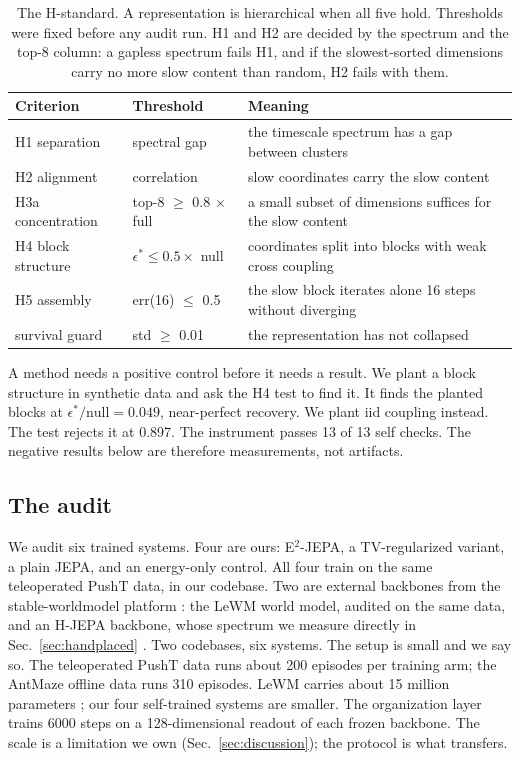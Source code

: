\documentclass[11pt]{article}
\begin{document}
\begin{table}[t]
\centering
\caption{The H-standard. A representation is hierarchical when all five hold. Thresholds were fixed before any audit run. H1 and H2 are decided by the spectrum and the top-8 column: a gapless spectrum fails H1, and if the slowest-sorted dimensions carry no more slow content than random, H2 fails with them.}
\label{tab:hstandard}
\begin{tabular}{llp{7.2cm}}
\toprule
Criterion & Threshold & Meaning \\
\midrule
H1 separation & spectral gap & the timescale spectrum has a gap between clusters \\
H2 alignment & correlation & slow coordinates carry the slow content \\
H3a concentration & top-8 $\geq$ 0.8 $\times$ full & a small subset of dimensions suffices for the slow content \\
H4 block structure & $\epsilon^* \leq 0.5 \times$ null & coordinates split into blocks with weak cross coupling \\
H5 assembly & err(16) $\leq$ 0.5 & the slow block iterates alone 16 steps without diverging \\
survival guard & std $\geq$ 0.01 & the representation has not collapsed \\
\bottomrule
\end{tabular}
\end{table}

A method needs a positive control before it needs a result.
We plant a block structure in synthetic data and ask the H4 test to find it.
It finds the planted blocks at $\epsilon^* / \mathrm{null} = 0.049$, near-perfect recovery.
We plant iid coupling instead.
The test rejects it at 0.897.
The instrument passes 13 of 13 self checks.
The negative results below are therefore measurements, not artifacts.

\subsection{The audit}

We audit six trained systems.
Four are ours: E$^2$-JEPA, a TV-regularized variant, a plain JEPA, and an energy-only control.
All four train on the same teleoperated PushT data, in our codebase.
Two are external backbones from the stable-worldmodel platform \citep{swm}: the LeWM world model, audited on the same data, and an H-JEPA backbone, whose spectrum we measure directly in Sec.~\ref{sec:handplaced}
\citep{lewm,hjepa}.
Two codebases, six systems.
The setup is small and we say so.
The teleoperated PushT data runs about 200 episodes per training arm; the AntMaze offline data runs 310 episodes.
LeWM carries about 15 million parameters \citep{lewm}; our four self-trained systems are smaller.
The organization layer trains 6000 steps on a 128-dimensional readout of each frozen backbone.
The scale is a limitation we own (Sec.~\ref{sec:discussion}); the protocol is what transfers.
\end{document}
